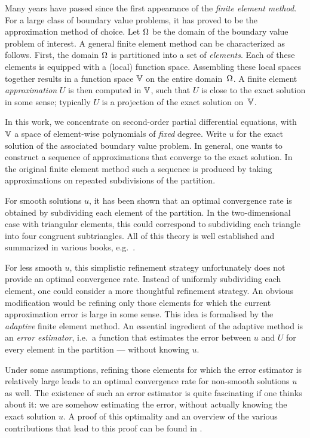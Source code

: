 \documentclass[thesis.tex]{subfiles}
\begin{document}
Many years have passed since the first appearance of the \emph{finite element method}. 
For a large class of boundary value problems, it has proved to be the approximation method of choice. 
Let $\Omega$ be the domain of the boundary value problem of interest. A general finite element method can be characterized as follows.
First, the domain $\Omega$ is partitioned into a set of \emph{elements}.  Each of these elements is equipped with a (local) function space.
Assembling these local spaces together results in a function space $\mathbb{V}$ on the entire domain~$\Omega$. A finite element \emph{approximation} $U$
is then computed in $\mathbb{V}$, such that $U$ is close to the exact solution in some sense;
typically $U$ is a projection of the exact solution on~$\mathbb{V}$.

In this work, we concentrate on second-order partial differential equations, with $\mathbb{V}$
a space of element-wise polynomials of \emph{fixed} degree. Write $u$ for the exact solution
of the associated boundary value problem. In general, one wants to construct a sequence of approximations that converge to
the exact solution. In the original finite element method such a sequence is produced by taking
approximations on repeated subdivisions of the partition. 

For smooth solutions $u$, it has been shown
that an optimal convergence rate is obtained by subdividing each element of the partition. 
In the two-dimensional case with triangular elements, this could correspond to subdividing each triangle into four
congruent subtriangles. All of this theory is well established and summarized  in various books, e.g.~\cite{brenner, zienkiewicz1977finite}.

For less smooth $u$, this simplistic refinement strategy unfortunately does not provide an optimal convergence rate.
Instead of uniformly subdividing each element, one could consider a more thoughtful refinement strategy.
An obvious modification would be refining only those elements for which the current approximation error is large in some sense.
This idea is formalised by the \emph{adaptive} finite element method.
An essential ingredient of the adaptive method is an \emph{error estimator}, i.e.~a function that estimates
the error between $u$ and $U$ for every element in the partition --- without knowing $u$. 

Under some assumptions, refining those
elements for which the error estimator is relatively large leads to an optimal convergence rate for non-smooth
solutions $u$ as well. The existence of such an error estimator is quite fascinating  if one thinks about it: we
are somehow estimating the error, without actually knowing the exact solution $u$. 
A proof of this optimality and an overview of the various contributions that lead to this proof can be found in \cite{cascon2008}.
\end{document}
